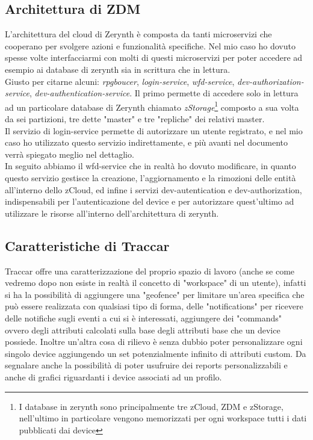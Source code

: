 \documentclass[a4paper,titlepage,12pt]{book}
\begin{document}
\subsection{
\sffamily Architettura di ZDM}
L'architettura del cloud di Zerynth è composta da tanti microservizi che cooperano per svolgere azioni e funzionalità specifiche. Nel mio caso ho dovuto spesse volte interfacciarmi con molti di questi microservizi per poter accedere ad esempio ai database di zerynth sia in scrittura che in lettura. \\
Giusto per citarne alcuni: \textit{rpgboucer}, \textit{login-service}, \textit{wfd-service}, \textit{dev-authorization-service}, \textit{dev-authentication-service}. Il primo permette di accedere solo in lettura ad un particolare database di Zerynth chiamato \textit{zStorage}\footnote{\sffamily I database in zerynth sono principalmente tre zCloud, ZDM e zStorage, nell'ultimo in particolare vengono memorizzati per ogni workspace tutti i dati pubblicati dai device} composto a sua volta da sei partizioni, tre dette "master" e tre "repliche" dei relativi master.\\
Il servizio di login-service permette di autorizzare un utente registrato, e nel mio caso ho utilizzato questo servizio indirettamente, e più avanti nel documento verrà spiegato meglio nel dettaglio.\\
In seguito abbiamo il wfd-service che in realtà ho dovuto modificare, in quanto questo servizio gestisce la creazione, l'aggiornamento e la rimozioni delle entità all'interno dello zCloud, ed infine i servizi dev-autentication e dev-authorization, indispensabili per l'autenticazione del device e per autorizzare quest'ultimo ad utilizzare le risorse all'interno dell'architettura di zerynth.

\subsection{
\sffamily Caratteristiche di Traccar}
Traccar offre una caratterizzazione del proprio spazio di lavoro (anche se come vedremo dopo non esiste in realtà il concetto di "workspace" di un utente), infatti si ha la possibilità di aggiungere una "geofence" per limitare un'area specifica che può essere realizzata con qualsiasi tipo di forma, delle "notifications" per ricevere delle notifiche sugli eventi a cui si è interessati, aggiungere dei "commands" ovvero degli attributi calcolati sulla base degli attributi base che un device possiede. Inoltre un'altra cosa di rilievo è senza dubbio poter personalizzare ogni singolo device aggiungendo un set potenzialmente infinito di attributi custom. Da segnalare anche la possibilità di poter usufruire dei reports personalizzabili e anche di grafici riguardanti i device associati ad un profilo. \\
\end{document}
